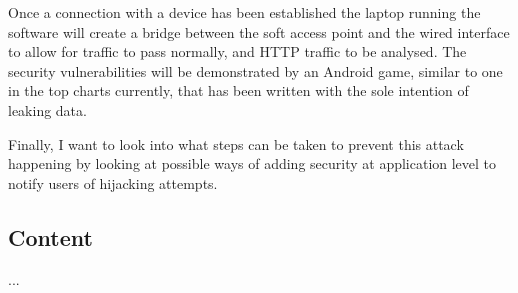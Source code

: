 Once a connection with a device has been established the laptop running the software will create a bridge between the soft access point and the wired interface to allow for traffic to pass normally, and HTTP traffic to be analysed. The security vulnerabilities will be demonstrated by an Android game, similar to one in the top charts currently, that has been written with the sole intention of leaking data. 

Finally, I want to look into what steps can be taken to prevent this attack happening by looking at possible ways of adding security at application level to notify users of hijacking attempts.

\subsection{Content}
...
\clearpage